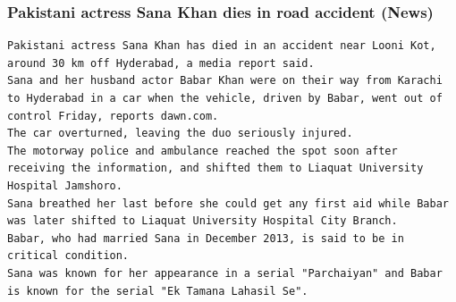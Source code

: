 \documentclass[BTech]{nitgoathesis}
\begin{document}
\subsubsection{Pakistani actress Sana Khan dies in road accident (News)}
\begin{lstlisting}[basicstyle=\scriptsize]
Pakistani actress Sana Khan has died in an accident near Looni Kot, around 30 km off Hyderabad, a media report said.
Sana and her husband actor Babar Khan were on their way from Karachi to Hyderabad in a car when the vehicle, driven by Babar, went out of control Friday, reports dawn.com.
The car overturned, leaving the duo seriously injured.
The motorway police and ambulance reached the spot soon after receiving the information, and shifted them to Liaquat University Hospital Jamshoro.
Sana breathed her last before she could get any first aid while Babar was later shifted to Liaquat University Hospital City Branch.
Babar, who had married Sana in December 2013, is said to be in critical condition.
Sana was known for her appearance in a serial "Parchaiyan" and Babar is known for the serial "Ek Tamana Lahasil Se".
\end{lstlisting}
\end{document}
